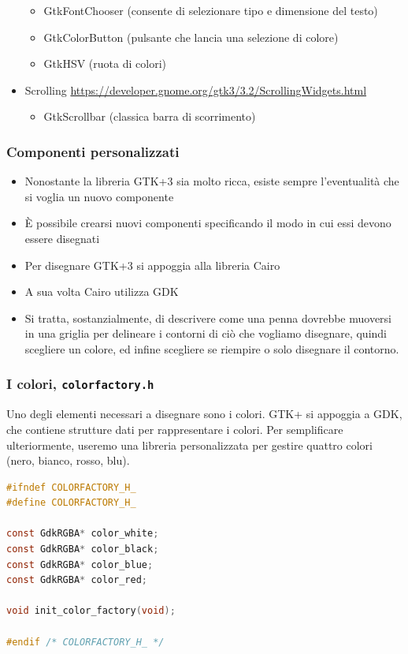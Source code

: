 \documentclass{beamer}
\begin{document}
\begin{frame}
\begin{itemize}
\begin{itemize}
  \item GtkFontChooser (consente di selezionare tipo e dimensione del testo)
  \item GtkColorButton (pulsante che lancia una selezione di colore)
  \item GtkHSV (ruota di colori)
 \end{itemize}
 \scriptsize
 \item Scrolling \url{https://developer.gnome.org/gtk3/3.2/ScrollingWidgets.html}
 \begin{itemize}
 \tiny
  \item GtkScrollbar (classica barra di scorrimento)
 \end{itemize}
\end{itemize}

\end{frame}

\begin{frame}
\frametitle{Componenti personalizzati}
\begin{itemize}
 \item Nonostante la libreria GTK+3 sia molto ricca, esiste sempre l'eventualità che si voglia un nuovo componente
 \item È possibile crearsi nuovi componenti specificando il modo in cui essi devono essere disegnati
 \item Per disegnare GTK+3 si appoggia alla libreria Cairo
 \item A sua volta Cairo utilizza GDK
 \item Si tratta, sostanzialmente, di descrivere come una penna dovrebbe muoversi in una griglia per delineare i contorni di ciò che vogliamo disegnare, quindi scegliere un colore, ed infine scegliere se riempire o solo disegnare il contorno.
\end{itemize}
\end{frame}

\begin{frame}[fragile]
\frametitle{I colori, \texttt{colorfactory.h}}
Uno degli elementi necessari a disegnare sono i colori. GTK+ si appoggia a GDK, che contiene strutture dati per rappresentare i colori. Per semplificare ulteriormente, useremo una libreria personalizzata per gestire quattro colori (nero, bianco, rosso, blu).
\begin{lstlisting}[language=C]
#ifndef COLORFACTORY_H_
#define COLORFACTORY_H_

const GdkRGBA* color_white;
const GdkRGBA* color_black;
const GdkRGBA* color_blue;
const GdkRGBA* color_red;

void init_color_factory(void);

#endif /* COLORFACTORY_H_ */
\end{lstlisting}
\end{frame}
\end{document}
